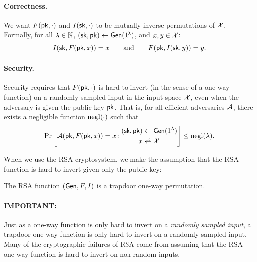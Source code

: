 \paragraph{Correctness.}
We want $F(\mathsf{pk}, \cdot)$ and $I({\mathsf{sk}}, \cdot)$ to be mutually inverse
permutations of $\cal X$.  Formally, for all $\lambda \in \mathbb{N}$,
$({\mathsf{sk}}, \mathsf{pk}) \gets \mathsf{Gen}(1^\lambda)$, and $x, y \in \mathcal{X}$:
\[ I({\mathsf{sk}}, F(\mathsf{pk}, x)) = x \qquad\text{and}\qquad F(\mathsf{pk}, I({\mathsf{sk}}, y)) = y. \]


\paragraph{Security.}
Security requires that $F(\mathsf{pk}, \cdot)$ is hard to invert (in the sense of a one-way function)
on a randomly sampled input in the input space $\mathcal{X}$, even when the adversary 
is given the public key $\mathsf{pk}$.
That is, for all efficient adversaries $\mathcal{A}$, there exists a negligible function $\operatorname{negl}(\cdot)$
such that 
\[ \Pr\left[ 
\calA(\pk, F(\pk, x)) = x
\colon \begin{aligned}
  (\sk, \pk) &\gets \Gen(1^\lambda)\\
  x &\getsr \calX
\end{aligned}\right] \leq \negl(\lambda).\]

When we use the RSA cryptosystem, we make the assumption 
that the RSA function is hard to invert given only the public key:
\begin{defn}
The RSA function $(\mathsf{Gen}, F, I)$ is a trapdoor one-way permutation.
\end{defn}

\paragraph{\textbf{IMPORTANT}:}
Just as a one-way function is only hard to invert on a \emph{randomly sampled input},
a trapdoor one-way function is only hard to invert on a randomly sampled input.
Many of the cryptographic failures of RSA come from assuming that the RSA
one-way function is hard to invert on non-random inputs.


